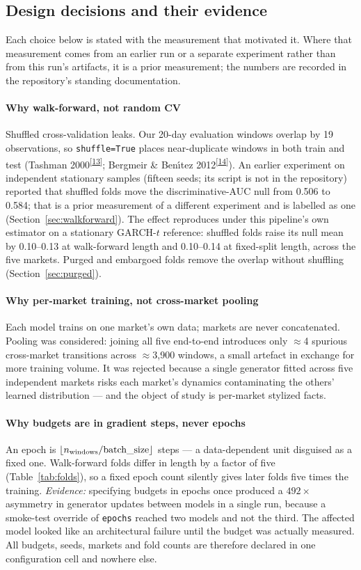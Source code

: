 \documentclass[11pt,a4paper]{article}
\makeatletter
\newcommand{\tcite}[1]{\textsuperscript{[\hyperlink{R:#1}{#1}]}}
\DeclareRobustCommand{\_}{\ifmmode\nfss@text{\textunderscore}\else\textunderscore\allowbreak\fi}
\makeatother
\begin{document}
\subsection{Design decisions and their evidence}
\label{sec:decisions}
Each choice below is stated with the measurement that motivated it. Where that measurement comes from an earlier run or a separate experiment rather than from this run's artifacts, it is a prior measurement; the numbers are recorded in the repository's standing documentation.

\paragraph{Why walk-forward, not random CV} Shuffled cross-validation leaks. Our 20-day evaluation windows overlap by 19 observations, so \texttt{shuffle=True} places near-duplicate windows in both train and test (Tashman 2000\tcite{13}; Bergmeir \& Ben\'{\i}tez 2012\tcite{14}). An earlier experiment on independent stationary samples (fifteen seeds; its script is not in the repository) reported that shuffled folds move the discriminative-AUC null from 0.506 to 0.584; that is a prior measurement of a different experiment and is labelled as one (Section~\ref{sec:walkforward}). The effect reproduces under this pipeline's own estimator on a stationary GARCH-$t$ reference: shuffled folds raise its null mean by 0.10--0.13 at walk-forward length and 0.10--0.14 at fixed-split length, across the five markets. Purged and embargoed folds remove the overlap without shuffling (Section~\ref{sec:purged}).

\paragraph{Why per-market training, not cross-market pooling} Each model trains on one market's own data; markets are never concatenated. Pooling was considered: joining all five end-to-end introduces only $\approx$4 spurious cross-market transitions across $\approx$3{,}900 windows, a small artefact in exchange for more training volume. It was rejected because a single generator fitted across five independent markets risks each market's dynamics contaminating the others' learned distribution --- and the object of study is per-market stylized facts.

\paragraph{Why budgets are in gradient steps, never epochs} An epoch is $\lfloor n_\text{windows}/\text{batch\_size}\rfloor$ steps --- a data-dependent unit disguised as a fixed one. Walk-forward folds differ in length by a factor of five (Table~\ref{tab:folds}), so a fixed epoch count silently gives later folds five times the training. \textit{Evidence:} specifying budgets in epochs once produced a $492\times$ asymmetry in generator updates between models in a single run, because a smoke-test override of \texttt{epochs} reached two models and not the third. The affected model looked like an architectural failure until the budget was actually measured. All budgets, seeds, markets and fold counts are therefore declared in one configuration cell and nowhere else.
\end{document}
